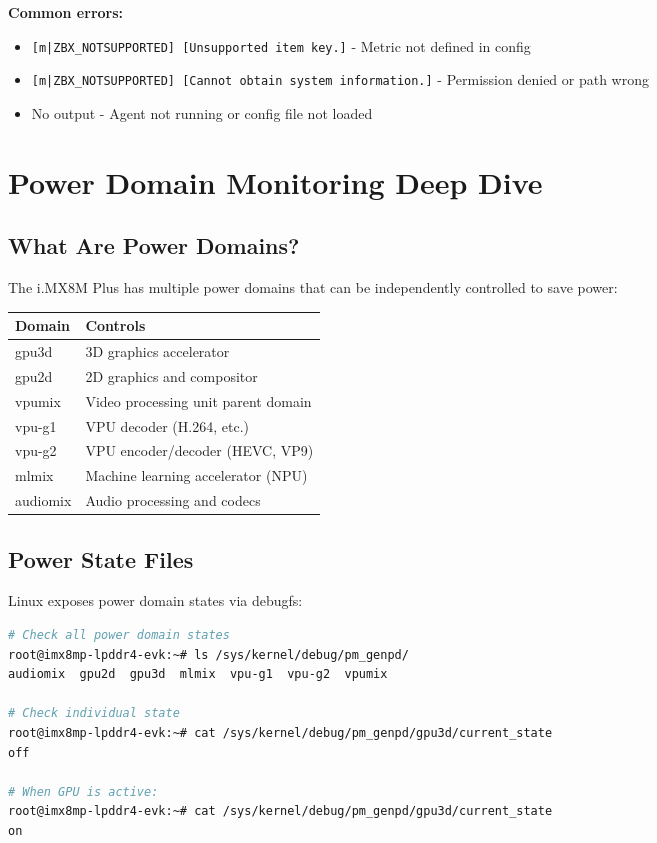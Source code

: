 \documentclass[12pt,a4paper]{report}
\begin{document}
\textbf{Common errors:}
\begin{itemize}
    \item \texttt{[m|ZBX\_NOTSUPPORTED] [Unsupported item key.]} - Metric not defined in config
    \item \texttt{[m|ZBX\_NOTSUPPORTED] [Cannot obtain system information.]} - Permission denied or path wrong
    \item No output - Agent not running or config file not loaded
\end{itemize}

\section{Power Domain Monitoring Deep Dive}

\subsection{What Are Power Domains?}

The i.MX8M Plus has multiple power domains that can be independently controlled to save power:

\begin{center}
\begin{tabular}{|l|p{8cm}|}
\hline
\textbf{Domain} & \textbf{Controls} \\
\hline
gpu3d & 3D graphics accelerator \\
\hline
gpu2d & 2D graphics and compositor \\
\hline
vpumix & Video processing unit parent domain \\
\hline
vpu-g1 & VPU decoder (H.264, etc.) \\
\hline
vpu-g2 & VPU encoder/decoder (HEVC, VP9) \\
\hline
mlmix & Machine learning accelerator (NPU) \\
\hline
audiomix & Audio processing and codecs \\
\hline
\end{tabular}
\end{center}

\subsection{Power State Files}

Linux exposes power domain states via debugfs:

\begin{lstlisting}[language=bash]
# Check all power domain states
root@imx8mp-lpddr4-evk:~# ls /sys/kernel/debug/pm_genpd/
audiomix  gpu2d  gpu3d  mlmix  vpu-g1  vpu-g2  vpumix

# Check individual state
root@imx8mp-lpddr4-evk:~# cat /sys/kernel/debug/pm_genpd/gpu3d/current_state
off

# When GPU is active:
root@imx8mp-lpddr4-evk:~# cat /sys/kernel/debug/pm_genpd/gpu3d/current_state
on
\end{lstlisting}
\end{document}
